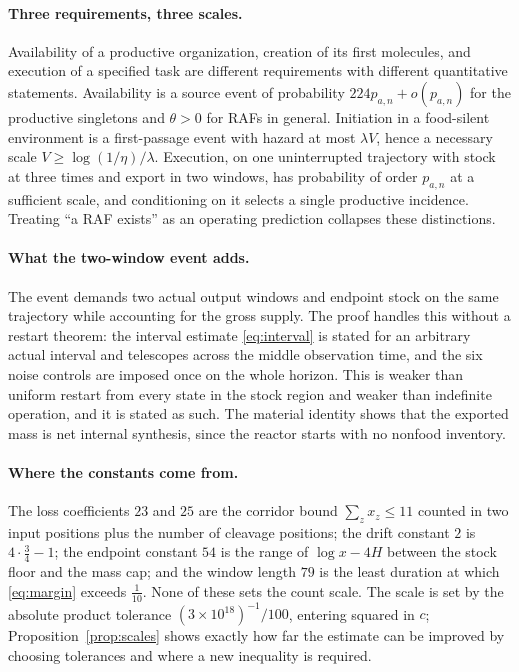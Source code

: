 \documentclass[11pt,letterpaper]{article}
\theoremstyle{plain}
\theoremstyle{definition}
\theoremstyle{remark}
\numberwithin{equation}{section}
\newcommand{\floorstock}{(3\times10^{18})^{-1}}
\begin{document}
\paragraph{Three requirements, three scales.}
Availability of a productive organization, creation of its first molecules, and execution of a specified task are different requirements with different quantitative statements. Availability is a source event of probability $224p_{a,n}+o(p_{a,n})$ for the productive singletons and $\theta>0$ for RAFs in general. Initiation in a food-silent environment is a first-passage event with hazard at most $\lambda V$, hence a necessary scale $V\ge\log(1/\eta)/\lambda$. Execution, on one uninterrupted trajectory with stock at three times and export in two windows, has probability of order $p_{a,n}$ at a sufficient scale, and conditioning on it selects a single productive incidence. Treating ``a RAF exists'' as an operating prediction collapses these distinctions.

\paragraph{What the two-window event adds.}
The event demands two actual output windows and endpoint stock on the same trajectory while accounting for the gross supply. The proof handles this without a restart theorem: the interval estimate \eqref{eq:interval} is stated for an arbitrary actual interval and telescopes across the middle observation time, and the six noise controls are imposed once on the whole horizon. This is weaker than uniform restart from every state in the stock region and weaker than indefinite operation, and it is stated as such. The material identity shows that the exported mass is net internal synthesis, since the reactor starts with no nonfood inventory.

\paragraph{Where the constants come from.}
The loss coefficients $23$ and $25$ are the corridor bound $\sum_zx_z\le11$ counted in two input positions plus the number of cleavage positions; the drift constant $2$ is $4\cdot\tfrac34-1$; the endpoint constant $54$ is the range of $\log x-4H$ between the stock floor and the mass cap; and the window length $79$ is the least duration at which \eqref{eq:margin} exceeds $\tfrac1{10}$. None of these sets the count scale. The scale is set by the absolute product tolerance $\floorstock/100$, entering squared in $c$; Proposition~\ref{prop:scales} shows exactly how far the estimate can be improved by choosing tolerances and where a new inequality is required.
\end{document}
